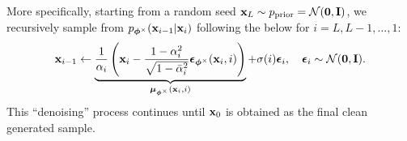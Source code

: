 More specifically, starting from a random seed ${\mathbf{x}}_L \sim p_{\text{prior}} = \mathcal{N}(\bm{0},{\mathbf{I}})$, we recursively sample from $p_{\bm{\phi}^\times}({\mathbf{x}}_{i-1} | {\mathbf{x}}_i)$ following the  below for $i = L, L-1, \dots, 1$:
\begin{align}\label{eq:ddpm-sampling}
    {\mathbf{x}}_{i-1} \leftarrow \underbrace{\frac{1}{\alpha_i}\left( {\mathbf{x}}_i  - \frac{1-\alpha_i^2}{\sqrt{1-\bar{\alpha}_i^2}} \bm{\epsilon}_{\bm{\phi}^\times}({\mathbf{x}}_i, i)\right)}_{\bm{\mu}_{\bm{\phi}^\times}({\mathbf{x}}_i, i)} +\sigma(i) \bm{\epsilon}_i,\quad \bm{\epsilon}_i\sim  \mathcal{N}(\bm{0},{\mathbf{I}}).
\end{align}
This ``denoising'' process continues until ${\mathbf{x}}_0$ is obtained as the final clean generated sample. 






